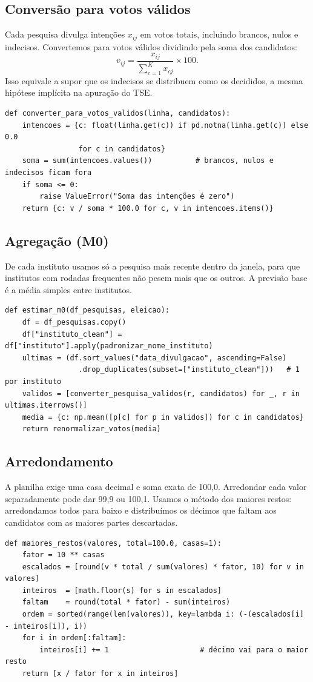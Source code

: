 \documentclass[10.5pt,a4paper]{article}
\begin{document}
\subsection{Conversão para votos válidos}
Cada pesquisa divulga intenções $x_{ij}$ em votos totais, incluindo brancos, nulos e indecisos. Convertemos para votos válidos dividindo pela soma dos candidatos:
\begin{equation}
v_{ij}=\frac{x_{ij}}{\sum_{c=1}^{K}x_{cj}}\times 100 .
\end{equation}
Isso equivale a supor que os indecisos se distribuem como os decididos, a mesma hipótese implícita na apuração do TSE.
\begin{lstlisting}
def converter_para_votos_validos(linha, candidatos):
    intencoes = {c: float(linha.get(c)) if pd.notna(linha.get(c)) else 0.0
                 for c in candidatos}
    soma = sum(intencoes.values())          # brancos, nulos e indecisos ficam fora
    if soma <= 0:
        raise ValueError("Soma das intenções é zero")
    return {c: v / soma * 100.0 for c, v in intencoes.items()}
\end{lstlisting}

\subsection{Agregação (M0)}
De cada instituto usamos só a pesquisa mais recente dentro da janela, para que institutos com rodadas frequentes não pesem mais que os outros. A previsão base é a média simples entre institutos.
\begin{lstlisting}
def estimar_m0(df_pesquisas, eleicao):
    df = df_pesquisas.copy()
    df["instituto_clean"] = df["instituto"].apply(padronizar_nome_instituto)
    ultimas = (df.sort_values("data_divulgacao", ascending=False)
                 .drop_duplicates(subset=["instituto_clean"]))   # 1 por instituto
    validos = [converter_pesquisa_validos(r, candidatos) for _, r in ultimas.iterrows()]
    media = {c: np.mean([p[c] for p in validos]) for c in candidatos}
    return renormalizar_votos(media)
\end{lstlisting}

\subsection{Arredondamento}
A planilha exige uma casa decimal e soma exata de 100,0. Arredondar cada valor separadamente pode dar 99,9 ou 100,1. Usamos o método dos maiores restos: arredondamos todos para baixo e distribuímos os décimos que faltam aos candidatos com as maiores partes descartadas.
\begin{lstlisting}
def maiores_restos(valores, total=100.0, casas=1):
    fator = 10 ** casas
    escalados = [round(v * total / sum(valores) * fator, 10) for v in valores]
    inteiros  = [math.floor(s) for s in escalados]
    faltam    = round(total * fator) - sum(inteiros)
    ordem = sorted(range(len(valores)), key=lambda i: (-(escalados[i] - inteiros[i]), i))
    for i in ordem[:faltam]:
        inteiros[i] += 1                     # décimo vai para o maior resto
    return [x / fator for x in inteiros]
\end{lstlisting}
\end{document}
